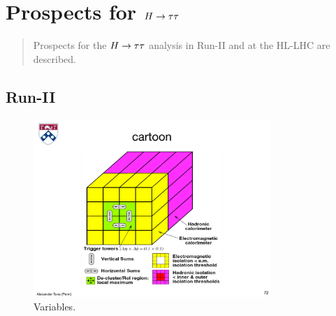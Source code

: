 \chapter[Prospects for $\Htautau$][Prospects for $\Htautau$]{Prospects for $\Htautau$}
\label{chap:prospects}

\begin{quote}
Prospects for the $\Htautau$ analysis in Run-II and at the HL-LHC are described.
\end{quote}

\section{Run-II}
\label{sec:prospects-run2}

\begin{figure}[tp]
  \centering
  \includegraphics[width=0.80\textwidth]{figures/trigger/cartoonL1}
  \caption{Variables.}
  \label{fig:prospects-trigger-cartoonL1}
\end{figure}

